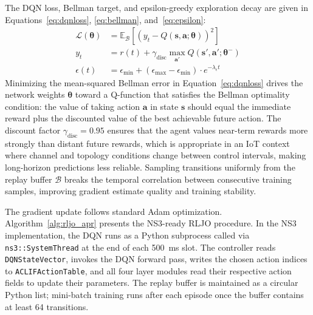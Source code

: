 \documentclass[a4paper]{cas-dc}
\numberwithin{equation}{section}
\begin{document}
The DQN loss, Bellman target, and epsilon-greedy exploration decay are given in Equations~\ref{eq:dqnloss}, \ref{eq:bellman}, and~\ref{eq:epsilon}:
\begin{align}
\label{eq:dqnloss}
\mathcal{L}(\boldsymbol{\theta}) &= \mathbb{E}_{\mathcal{B}}
  \!\left[\!\left(y_t - Q(\mathbf{s},\mathbf{a};\boldsymbol{\theta})\right)^{2}\right] \\[4pt]
\label{eq:bellman}
y_t &= r(t) + \gamma_{\text{disc}}\max_{\mathbf{a}'}Q(\mathbf{s}',\mathbf{a}';\boldsymbol{\theta}^{-}) \\[4pt]
\label{eq:epsilon}
\epsilon(t) &= \epsilon_{\min}+(\epsilon_{\max}-\epsilon_{\min})\cdot e^{-\lambda_{\epsilon}t}
\end{align}
Minimizing the mean-squared Bellman error in Equation~\ref{eq:dqnloss} drives the network weights $\boldsymbol{\theta}$ toward a Q-function that satisfies the Bellman optimality condition: the value of taking action $\mathbf{a}$ in state $\mathbf{s}$ should equal the immediate reward plus the discounted value of the best achievable future action. The discount factor $\gamma_{\text{disc}}=0.95$ ensures that the agent values near-term rewards more strongly than distant future rewards, which is appropriate in an IoT context where channel and topology conditions change between control intervals, making long-horizon predictions less reliable. Sampling transitions uniformly from the replay buffer $\mathcal{B}$ breaks the temporal correlation between consecutive training samples, improving gradient estimate quality and training stability.

The gradient update follows standard Adam optimization. Algorithm~\ref{alg:rljo_apr} presents the NS3-ready RLJO procedure. {\sloppy In the NS3 implementation, the DQN runs as a Python subprocess called via \texttt{ns3::SystemThread} at the end of each 500~ms slot. The controller reads \texttt{DQNStateVector}, invokes the DQN forward pass, writes the chosen action indices to \texttt{ACLIFActionTable}, and all four layer modules read their respective action fields to update their parameters. The replay buffer is maintained as a circular Python list; mini-batch training runs after each episode once the buffer contains at least 64 transitions.}
\end{document}

